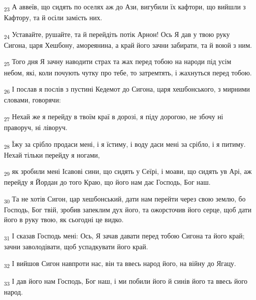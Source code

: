 \begin{tcolorbox}
\textsubscript{23} А аввеїв, що сидять по оселях аж до Ази, вигубили їх кафтори, що вийшли з Кафтору, та й осіли замість них.
\end{tcolorbox}
\begin{tcolorbox}
\textsubscript{24} Уставайте, рушайте, та й перейдіть потік Арнон! Ось Я дав у твою руку Сигона, царя Хешбону, амореянина, а край його зачни забирати, та й воюй з ним.
\end{tcolorbox}
\begin{tcolorbox}
\textsubscript{25} Того дня Я зачну наводити страх та жах перед тобою на народи під усім небом, які, коли почують чутку про тебе, то затремтять, і жахнуться перед тобою.
\end{tcolorbox}
\begin{tcolorbox}
\textsubscript{26} І послав я послів з пустині Кедемот до Сигона, царя хешбонського, з мирними словами, говорячи:
\end{tcolorbox}
\begin{tcolorbox}
\textsubscript{27} Нехай же я перейду в твоїм краї в дорозі, я піду дорогою, не збочу ні праворуч, ні ліворуч.
\end{tcolorbox}
\begin{tcolorbox}
\textsubscript{28} Їжу за срібло продаси мені, і я їстиму, і воду даси мені за срібло, і я питиму. Нехай тільки перейду я ногами,
\end{tcolorbox}
\begin{tcolorbox}
\textsubscript{29} як зробили мені Ісавові сини, що сидять у Сеїрі, і моави, що сидять ув Арі, аж перейду я Йордан до того Краю, що його нам дає Господь, Бог наш.
\end{tcolorbox}
\begin{tcolorbox}
\textsubscript{30} Та не хотів Сигон, цар хешбонський, дати нам перейти через свою землю, бо Господь, Бог твій, зробив запеклим дух його, та ожорсточив його серце, щоб дати його в руку твою, як сьогодні це видко.
\end{tcolorbox}
\begin{tcolorbox}
\textsubscript{31} І сказав Господь мені: Ось, Я зачав давати перед тобою Сигона та його край; зачни заволодівати, щоб успадкувати його край.
\end{tcolorbox}
\begin{tcolorbox}
\textsubscript{32} І вийшов Сигон навпроти нас, він та ввесь народ його, на війну до Ягацу.
\end{tcolorbox}
\begin{tcolorbox}
\textsubscript{33} І дав його нам Господь, Бог наш, і ми побили його й синів його та ввесь його народ.
\end{tcolorbox}
